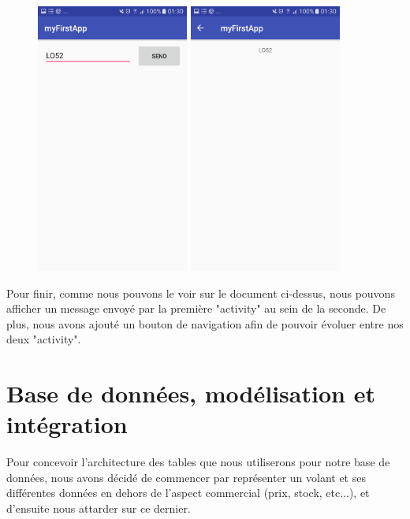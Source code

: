 \documentclass[french,a4paper,12pt]{report}
\begin{document}
 \begin{figure}[h]
     \begin{minipage}[c]{.46\linewidth}
         \centering
         \includegraphics[width=5cm]{21.png}
     \end{minipage}
     \hfill%
     \begin{minipage}[c]{.46\linewidth}
         \centering
         \includegraphics[width=5cm]{22.png}
     \end{minipage}
 \end{figure}

\bigbreak
Pour finir, comme nous pouvons le voir sur le document ci-dessus, nous pouvons
afficher un message envoyé par la première "activity" au sein de la seconde.
De plus, nous avons ajouté un bouton de navigation afin de pouvoir évoluer
entre nos deux "activity".

\chapter{Base de données, modélisation et intégration}
Pour concevoir l'architecture des tables que nous utiliserons pour notre base
de données, nous avons décidé de commencer par représenter un volant et ses
différentes données en dehors de l'aspect commercial (prix, stock, etc...),
et d'ensuite nous attarder sur ce dernier.
\end{document}
